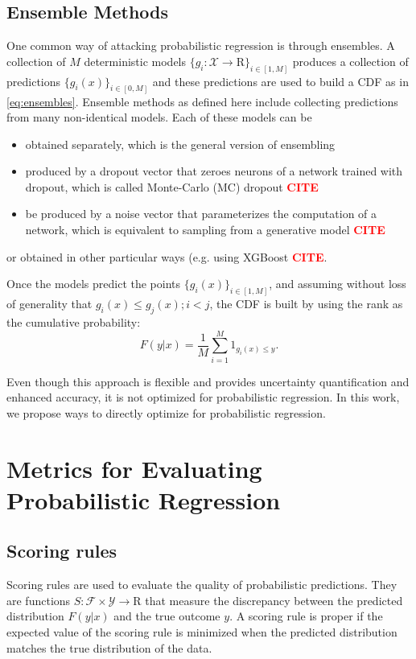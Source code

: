 \documentclass{article}
\newcommand{\citee}[1]{\textbf{\textcolor{red}{CITE}}}
\begin{document}
\subsection{Ensemble Methods}
One common way of attacking probabilistic regression is through ensembles.
A collection of $M$ deterministic models $\{g_i: \mathcal{X}\to \mathrm{R}\}_{i \in [1, M]}$ produces a collection of predictions $\{g_i(x)\}_{i\in [0, M]}$ and these predictions are used to build a CDF as in \ref{eq:ensembles}.
Ensemble methods as defined here include collecting predictions from many non-identical models. Each of these models can be
\begin{itemize}
    \item obtained separately, which is the general version of ensembling
    \item produced by a dropout vector that zeroes neurons of a network trained with dropout, which is called Monte-Carlo (MC) dropout \citee .
    \item be produced by a noise vector that parameterizes the computation of a network, which is equivalent to sampling from a generative model \citee .
\end{itemize}

or obtained in other particular ways (e.g. using XGBoost \citee).

Once the models predict the points $\{g_i(x)\}_{i \in [1,M]}$, and assuming without loss of generality that $g_i(x) \leq g_j(x) ; i < j$, the CDF is built by using the rank as the cumulative probability:
\begin{equation}\label{eq:ensembles}
    F(y|x) = \frac{1}{M}\sum_{i=1}^M \mathrm{1}_{g_i(x) \leq y}.
\end{equation}

Even though this approach is flexible and provides uncertainty quantification and enhanced accuracy, it is not optimized for probabilistic regression. In this work, we propose ways to directly optimize for probabilistic regression.




\section{Metrics for Evaluating Probabilistic Regression}
\subsection{Scoring rules}
Scoring rules are used to evaluate the quality of probabilistic predictions. They are functions $S: \mathcal{F} \times \mathcal{Y} \to \mathrm{R}$ that measure the discrepancy between the predicted distribution $F(y|x)$ and the true outcome $y$. A scoring rule is proper if the expected value of the scoring rule is minimized when the predicted distribution matches the true distribution of the data. 
\end{document}
